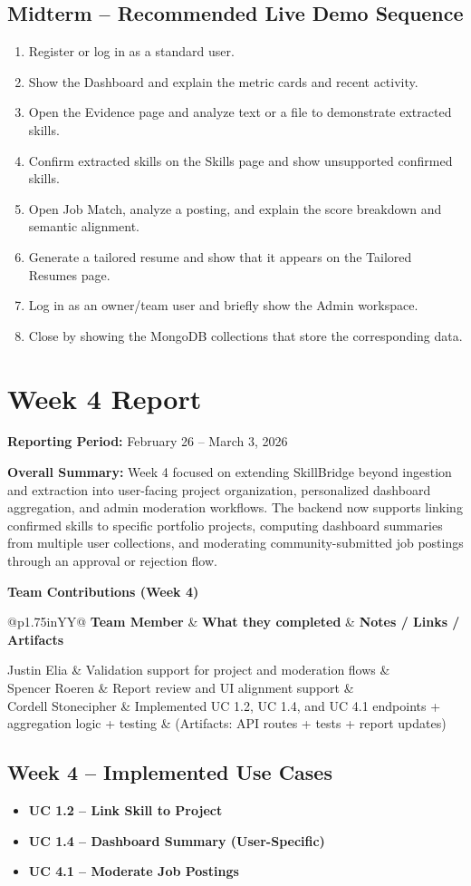 \documentclass[11pt]{article}
\makeatletter
\newcommand{\WeekReport}[4]{
  \clearpage
  \section*{Week #1 Report}
  \addcontentsline{toc}{section}{Week #1 Report}
  \vspace{-0.25em}
  \noindent\textbf{Reporting Period:} #2

  \vspace{0.5em}
  \noindent\textbf{Overall Summary:} #3

  \vspace{0.75em}
  \noindent\textbf{Team Contributions (Week #1)}
  \vspace{0.25em}

  \begin{table}[H]
    \renewcommand{\arraystretch}{1.2}
    \begin{tabularx}{\linewidth}{@{}p{1.75in}YY@{}}
      \toprule
      \textbf{Team Member} & \textbf{What they completed} & \textbf{Notes / Links / Artifacts} \\
      \midrule
      #4
      \bottomrule
    \end{tabularx}
  \end{table}
}
\makeatother
\begin{document}
\subsection*{Midterm -- Recommended Live Demo Sequence}
\begin{enumerate}
  \item Register or log in as a standard user.
  \item Show the Dashboard and explain the metric cards and recent activity.
  \item Open the Evidence page and analyze text or a file to demonstrate extracted skills.
  \item Confirm extracted skills on the Skills page and show unsupported confirmed skills.
  \item Open Job Match, analyze a posting, and explain the score breakdown and semantic alignment.
  \item Generate a tailored resume and show that it appears on the Tailored Resumes page.
  \item Log in as an owner/team user and briefly show the Admin workspace.
  \item Close by showing the MongoDB collections that store the corresponding data.
\end{enumerate}

\WeekReport{4}{February 26 -- March 3, 2026}{
Week 4 focused on extending SkillBridge beyond ingestion and extraction into user-facing project organization, personalized dashboard aggregation, and admin moderation workflows. The backend now supports linking confirmed skills to specific portfolio projects, computing dashboard summaries from multiple user collections, and moderating community-submitted job postings through an approval or rejection flow.
}{
Justin Elia & Validation support for project and moderation flows & \\
Spencer Roeren & Report review and UI alignment support & \\
Cordell Stonecipher & Implemented UC 1.2, UC 1.4, and UC 4.1 endpoints + aggregation logic + testing & (Artifacts: API routes + tests + report updates) \\
}

\subsection*{Week 4 -- Implemented Use Cases}
\begin{itemize}
  \item \textbf{UC 1.2 -- Link Skill to Project}
  \item \textbf{UC 1.4 -- Dashboard Summary (User-Specific)}
  \item \textbf{UC 4.1 -- Moderate Job Postings}
\end{itemize}
\end{document}
